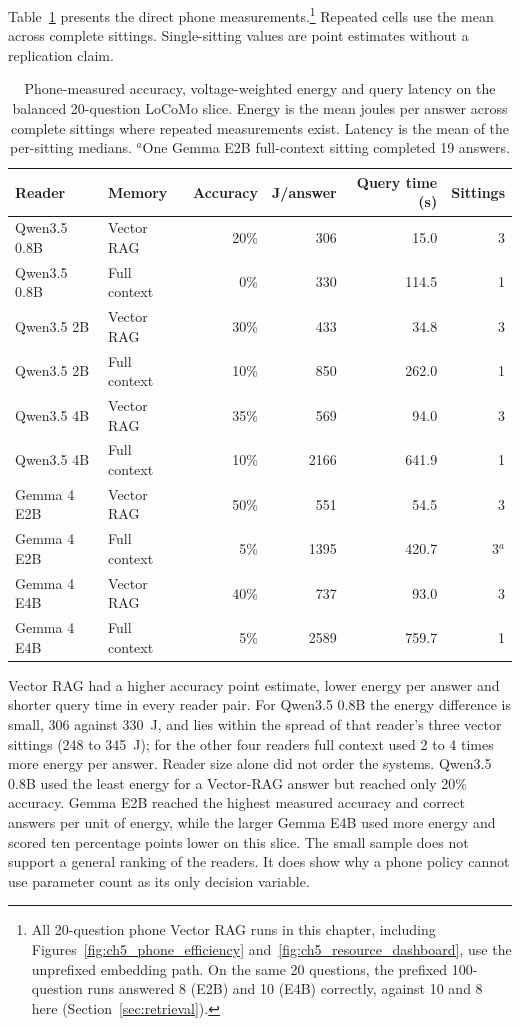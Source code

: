 Table~\ref{tab:ch5_phone_cells} presents the direct phone measurements.\footnote{All
20-question phone Vector RAG runs in this chapter, including
Figures~\ref{fig:ch5_phone_efficiency} and~\ref{fig:ch5_resource_dashboard}, use the
unprefixed embedding path. On the same 20 questions, the prefixed 100-question runs answered 8
(E2B) and 10 (E4B) correctly, against 10 and 8 here (Section~\ref{sec:retrieval}).} Repeated cells
use the mean across complete sittings. Single-sitting values are point estimates without
a replication claim.

\begin{table}[htbp]
  \centering
  \small
  \setlength{\tabcolsep}{4.2pt}
  \begin{tabular}{llrrrr}
    \toprule
    Reader & Memory & Accuracy & J/answer & Query time (s) & Sittings \\
    \midrule
    Qwen3.5 0.8B & Vector RAG   & 20\% & 306  & 15.0  & 3 \\
    Qwen3.5 0.8B & Full context &  0\% & 330  & 114.5 & 1 \\
    Qwen3.5 2B   & Vector RAG   & 30\% & 433  & 34.8  & 3 \\
    Qwen3.5 2B   & Full context & 10\% & 850  & 262.0 & 1 \\
    Qwen3.5 4B   & Vector RAG   & 35\% & 569  & 94.0  & 3 \\
    Qwen3.5 4B   & Full context & 10\% & 2166 & 641.9 & 1 \\
    Gemma 4 E2B  & Vector RAG   & 50\% & 551  & 54.5  & 3 \\
    Gemma 4 E2B  & Full context &  5\% & 1395 & 420.7 & 3$^{a}$ \\
    Gemma 4 E4B  & Vector RAG   & 40\% & 737  & 93.0  & 3 \\
    Gemma 4 E4B  & Full context &  5\% & 2589 & 759.7 & 1 \\
    \bottomrule
  \end{tabular}
  \caption{Phone-measured accuracy, voltage-weighted energy and query latency on the
  balanced 20-question LoCoMo slice. Energy is the mean joules per answer across complete
  sittings where repeated measurements exist. Latency is the mean of the per-sitting
  medians. $^{a}$One Gemma E2B full-context sitting completed 19 answers.}
  \label{tab:ch5_phone_cells}
\end{table}

Vector RAG had a higher accuracy point estimate, lower energy per answer and shorter
query time in every reader pair. For Qwen3.5 0.8B the energy difference is small, 306 against
330~J, and lies within the spread of that reader's three vector sittings (248 to 345~J); for the
other four readers full context used 2 to 4 times more energy per answer. Reader size alone did not order the systems. Qwen3.5
0.8B used the least energy for a Vector-RAG answer but reached only 20\% accuracy. Gemma
E2B reached the highest measured accuracy and correct answers per unit of energy, while the larger Gemma
E4B used more energy and scored ten percentage points lower on this slice. The small
sample does not support a general ranking of the readers. It does show why a phone
policy cannot use parameter count as its only decision variable.

